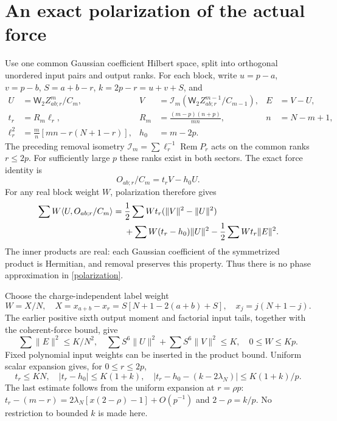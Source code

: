 \documentclass[11pt,a4paper]{article}
\newcommand{\Rem}{\operatorname{Rem}}
\newcommand{\W}{\mathsf W_2}
\newcommand{\Id}{\mathcal I}
\begin{document}
\newpage
\section{An exact polarization of the actual force}
Use one common Gaussian coefficient Hilbert space, split into
orthogonal unordered input pairs and output ranks. For each block,
write $u=p-a$, $v=p-b$, $S=a+b-r$, $k=2p-r=u+v+S$, and
\begin{align}
 U&=\W Z^m_{ab;r}/C_m,&
 V&=\Id_m(\W Z^{m-1}_{ab;r}/C_{m-1}),& E&=V-U,\\
 t_r&=R_m\ell_r,&R_m&=\frac{(m-p)(n+p)}{mn},& n&=N-m+1,\\
 \ell_r^2&=\frac m n[mn-r(N+1-r)],&h_0&=m-2p.&&
\end{align}
The preceding removal isometry $\Id_m=\sum\ell_r^{-1}\Rem P_r$
acts on the common ranks $r\le2p$. For sufficiently large $p$
these ranks exist in both sectors. The exact force identity is
\begin{equation}
 O_{ab;r}/C_m=t_rV-h_0U.\label{force}
\end{equation}
For any real block weight $W$, polarization therefore gives
\begin{align}
 \sum W\langle U,O_{ab;r}/C_m\rangle
 ={}&\frac12\sum Wt_r(\|V\|^2-\|U\|^2)\notag\\
 &+\sum W(t_r-h_0)\|U\|^2
       -\frac12\sum Wt_r\|E\|^2.\label{polarization}
\end{align}
The inner products are real: each Gaussian coefficient of the
symmetrized product is Hermitian, and removal preserves this property.
Thus there is no phase approximation in \eqref{polarization}.

Choose the charge-independent label weight
\begin{equation}
 W=X/N,\quad X=x_{a+b}-x_r=S[N+1-2(a+b)+S],\quad x_j=j(N+1-j).
\end{equation}
The earlier positive sixth output moment and factorial input tails,
together with the coherent-force bound, give
\begin{equation}
 \sum\|E\|^2\le K/N^2,\quad
 \sum S^6\|U\|^2+\sum S^6\|V\|^2\le K,\quad 0\le W\le Kp.
 \label{bounds}
\end{equation}
Fixed polynomial input weights can be inserted in the product bound.
Uniform scalar expansion gives, for $0\le r\le2p$,
\begin{equation}
 t_r\le KN,\quad |t_r-h_0|\le K(1+k),\quad
 |t_r-h_0-(k-2\lambda_N)|\le K(1+k)/p.\label{scalar}
\end{equation}
The last estimate follows from the uniform expansion at $r=\rho p$:
$t_r-(m-r)=2\lambda_N[x(2-\rho)-1]+O(p^{-1})$ and
$2-\rho=k/p$. No restriction to bounded $k$ is made here.
\end{document}
